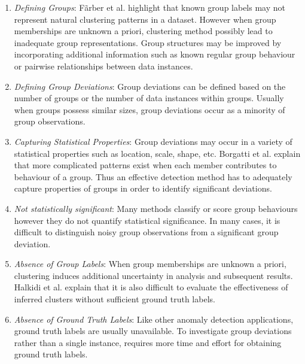 \begin{enumerate}[\textbullet]
\item {\it  Defining Groups}:
 F\~{a}rber et al. \cite{ClusterEval}   highlight that known group labels may not represent natural clustering patterns in a dataset. 
 However when group memberships are unknown a priori,   clustering method possibly lead to inadequate group representations. Group structures  may be improved by incorporating additional information such as known regular group behaviour or pairwise relationships between data instances. 
 \item {\it Defining Group Deviations}: Group deviations can be defined based on the number of groups or the number of  data instances within groups. Usually when groups possess similar sizes, group deviations occur as a minority of group observations.    
\item {\it Capturing Statistical Properties}: Group deviations may occur in a variety of statistical properties such as location, scale, shape, etc.    Borgatti et al. \cite{GroupSocialMedia} explain that more complicated patterns exist when each member contributes to behaviour of a group. Thus an effective detection method has to adequately capture properties of groups in order to identify significant deviations.
\item {\it Not statistically significant}: Many methods classify or score group behaviours however they do not quantify statistical significance. In many cases, it is difficult to distinguish noisy group observations from a significant group deviation. 
\item {\it Absence of Group Labels}: When group memberships are unknown a priori, clustering  induces additional uncertainty in analysis and subsequent results. Halkidi et al. \cite{ClusterValidity} explain that it is also difficult to evaluate the effectiveness of inferred clusters without sufficient ground truth labels. 
\item {\it Absence of Ground Truth Labels}: Like other anomaly detection applications, ground truth labels are usually unavailable. To investigate group deviations rather than a single  instance, requires more time and effort for obtaining  ground truth labels.  

\end{enumerate}
